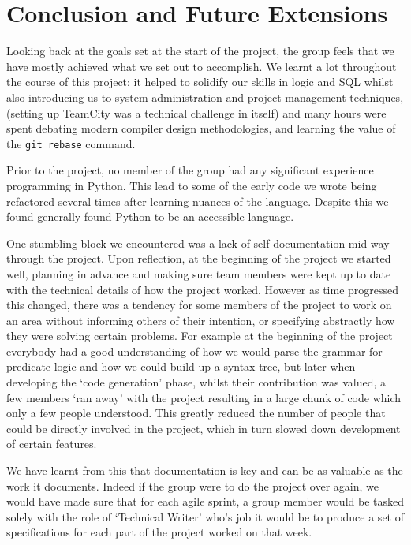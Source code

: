 \documentclass[a4paper, 11pt]{article}
\begin{document}
\section{Conclusion and Future Extensions}
  
  Looking back at the goals set at the start of the project, the group feels 
  that we have mostly achieved what we set out to accomplish. We learnt a lot
  throughout the course of this project; it helped to solidify our skills in
  logic and SQL whilst also introducing us to system administration and project
  management techniques, (setting up TeamCity was a technical challenge in itself) 
  and many hours were spent debating modern compiler design methodologies, and 
  learning the value of the \texttt{git rebase} command.

  Prior to the project, no member of the group had any significant
  experience programming in Python.  This lead to some of the early code we
  wrote being refactored several times after learning nuances of the
  language. Despite this we found generally found Python to be an accessible
  language.

  One stumbling block we encountered was a lack of self documentation mid way
  through the project. Upon reflection, at the beginning of the project we 
  started well, planning in advance and making sure team members were kept up 
  to date with the technical details of how the project worked. However as time 
  progressed this changed, there was a tendency for some members of the project 
  to work on an area without informing others of their intention, or specifying 
  abstractly how they were solving certain problems. For example at the beginning 
  of the project everybody had a good understanding of how we would parse the 
  grammar for predicate logic and how we could build up a syntax tree, but later 
  when developing the `code generation' phase, whilst their contribution was
  valued, a few members `ran away' with the project resulting in a large chunk of code which only 
  a few people understood. This greatly reduced the number of people that could
  be directly involved in the project, which in turn slowed down development of certain
  features. 
  
  We have learnt from this that documentation is key and can be as
  valuable as the work it documents. Indeed if the
  group were to do the project over again, we would have made sure that for each
  agile sprint, a group member would be tasked solely with the role of `Technical
  Writer' who's job it would be to produce a set of specifications for each part
  of the project worked on that week.
\end{document}
